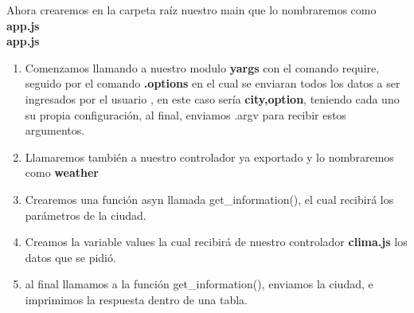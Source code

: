 \documentclass{report}
\begin{document}
    
   Ahora crearemos en la carpeta raíz nuestro main que lo nombraremos como \textbf{app.js}
   \\
   \textbf{app.js}
   \\
   \begin{enumerate}
       \item Comenzamos llamando a nuestro modulo \textbf{yargs} con el comando require, seguido por el comando \textbf{.options} en el cual se enviaran todos los datos a ser ingresados por el usuario , en este caso sería \textbf{city,option}, teniendo cada uno su propia configuración, al final, enviamos .argv para recibir estos argumentos.
       \item Llamaremos también a nuestro controlador ya exportado y lo nombraremos como \textbf{weather}
       \item Crearemos una función asyn llamada get\_information(), el cual recibirá los parámetros de la ciudad.
       \item Creamos la variable values la cual recibirá de nuestro controlador \textbf{clima.js} los datos que se pidió.
       \item al final llamamos a la función get\_information(), enviamos la ciudad, e imprimimos la respuesta dentro de una tabla. 
   \end{enumerate}
   
   
\end{document}

